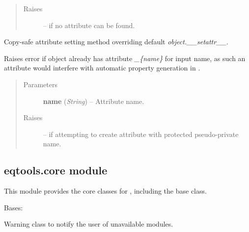 \documentclass[letterpaper,10pt,english]{sphinxmanual}
\begin{document}
\begin{fulllineitems}
\begin{fulllineitems}
\begin{quote}
\begin{description}
\item[{Raises}] \leavevmode
{} -- 
if no attribute can be found.

\end{description}\end{quote}

\end{fulllineitems}


\begin{fulllineitems}
\label{eqtools:eqtools.afilereader.AFileReader.__setattr__}
Copy-safe attribute setting method overriding default
\emph{object.\_\_setattr\_\_}.

Raises error if object already has attribute \emph{\_\{name\}} for input name,
as such an attribute would interfere with automatic property generation
in {\hyperref[eqtools:eqtools.afilereader.AFileReader.__getattribute__]{}}.
\begin{quote}\begin{description}
\item[{Parameters}] \leavevmode
\textbf{name} (\emph{String}) --
Attribute name.

\item[{Raises}] \leavevmode
{} -- 
if attempting to create attribute with protected
pseudo-private name.

\end{description}\end{quote}

\end{fulllineitems}


\end{fulllineitems}



\subsection{eqtools.core module}
\label{eqtools:module-eqtools.core}\label{eqtools:eqtools-core-module}
This module provides the core classes for {\hyperref[eqtools:module-eqtools]{}}, including the
base {\hyperref[eqtools:eqtools.core.Equilibrium]{}} class.

\begin{fulllineitems}
\label{eqtools:eqtools.core.ModuleWarning}
Bases: 

Warning class to notify the user of unavailable modules.

\end{fulllineitems}
\end{document}
